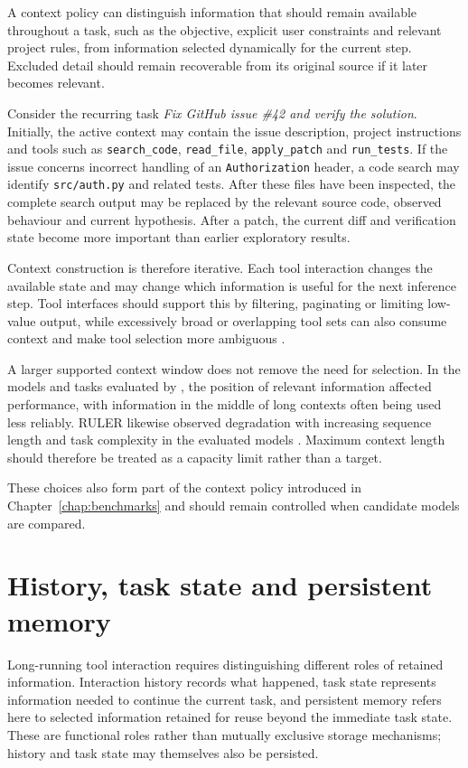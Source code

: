 A context policy can distinguish information that should remain available throughout a task, such as the objective, explicit user constraints and relevant project rules, from information selected dynamically for the current step. Excluded detail should remain recoverable from its original source if it later becomes relevant.

Consider the recurring task \emph{Fix GitHub issue \#42 and verify the solution}. Initially, the active context may contain the issue description, project instructions and tools such as \texttt{search\_code}, \texttt{read\_file}, \texttt{apply\_patch} and \texttt{run\_tests}. If the issue concerns incorrect handling of an \texttt{Authorization} header, a code search may identify \texttt{src/auth.py} and related tests. After these files have been inspected, the complete search output may be replaced by the relevant source code, observed behaviour and current hypothesis. After a patch, the current diff and verification state become more important than earlier exploratory results.

Context construction is therefore iterative. Each tool interaction changes the available state and may change which information is useful for the next inference step. Tool interfaces should support this by filtering, paginating or limiting low-value output, while excessively broad or overlapping tool sets can also consume context and make tool selection more ambiguous \parencite{anthropic2025tools}.

A larger supported context window does not remove the need for selection. In the models and tasks evaluated by \textcite{liu2024lostmiddle}, the position of relevant information affected performance, with information in the middle of long contexts often being used less reliably. RULER likewise observed degradation with increasing sequence length and task complexity in the evaluated models \parencite{hsieh2024ruler}. Maximum context length should therefore be treated as a capacity limit rather than a target.

These choices also form part of the context policy introduced in Chapter~\ref{chap:benchmarks} and should remain controlled when candidate models are compared.

\section{History, task state and persistent memory}
\label{sec:history-memory}

Long-running tool interaction requires distinguishing different roles of retained information. Interaction history records what happened, task state represents information needed to continue the current task, and persistent memory refers here to selected information retained for reuse beyond the immediate task state. These are functional roles rather than mutually exclusive storage mechanisms; history and task state may themselves also be persisted.

